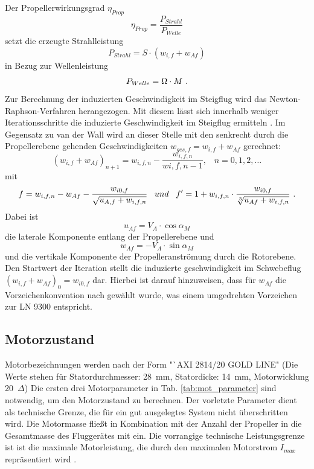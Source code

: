 Der Propellerwirkungsgrad \ensuremath{\eta_{Prop}} 
\begin{equation}
	\eta_{Prop} = \frac{P_{Strahl}}{P_{Welle}}
\end{equation}
setzt die erzeugte Strahlleistung 
\begin{equation}
	P_{Strahl} = S\cdot (w_{i,f}+ w_{Af})
	\label{eq:strahlleistung}
\end{equation}
in Bezug zur Wellenleistung
\begin{equation}
	P_{Welle} = \Omega \cdot M ~\text{.}
\end{equation} 
Zur Berechnung der induzierten Geschwindigkeit im Steigflug wird das Newton-Raphson-Verfahren herangezogen. Mit diesem lässt sich innerhalb weniger Iterationsschritte die induzierte Geschwindigkeit im Steigflug ermitteln \cite[S.153]{Wall.2015}. Im Gegensatz zu van der Wall wird an dieser Stelle mit den senkrecht durch die Propellerebene gehenden Geschwindigkeiten \ensuremath{w_{ges,f} = w_{i,f} + w_{Af}} gerechnet:
\begin{equation}
	(w_{i,f} + w_{Af})_{n+1} = w_{i,f,n} - \frac{w_{i,f,n}}{wi,f,n-1}, \;\;\; n = 0,1,2,\dots
\end{equation}
mit 
\begin{equation}
	f = w_{i,f,n} - w_{Af} - \frac{w_{i0,f}}{\sqrt{u_{A,f}+w_{i,f,n}}} \;\;\; und \;\;\; f'=1 + w_{i,f,n}\cdot\frac{w_{i0,f}}{\sqrt[3]{u_{Af}+w_{i,f,n}}} ~\text{.}
\end{equation}
Dabei ist 
\begin{equation}
	u_{Af} = V_{A}\cdot\cos\alpha_{M}
\end{equation}
die laterale Komponente entlang der Propellerebene und 
\begin{equation}
	w_{Af} = - V_{A}\cdot\sin\alpha_{M}
\end{equation}
und die vertikale Komponente der Propelleranströmung durch die Rotorebene. Den Startwert der Iteration stellt die induzierte geschwindigkeit im Schwebeflug \ensuremath{(w_{i,f}+w_{Af})_{0} = w_{i0,f}} dar. Hierbei ist darauf hinzuweisen, dass für \ensuremath{w_{Af}} die Vorzeichenkonvention nach \cite{Wall.2015} gewählt wurde, was einem umgedrehten Vorzeichen zur LN 9300 entspricht. 


\subsection{Motorzustand}
\label{subsec:motorzustand}
Motorbezeichnungen werden nach der Form "`AXI 2814/20 GOLD LINE"\; (Die Werte stehen für Statordurchmesser: \SI{28}{mm}, Statordicke: \SI{14}{mm}, Motorwicklung \SI{20}{\ensuremath{\Delta}}) 
Die ersten drei Motorparameter in Tab. \ref{tab:mot_parameter} sind notwendig, um den Motorzustand zu berechnen. Der vorletzte Parameter dient als technische Grenze, die für ein gut ausgelegtes System nicht überschritten wird. Die Motormasse fließt in Kombination mit der Anzahl der Propeller in die Gesamtmasse des Fluggerätes mit ein. Die vorrangige technische Leistungsgrenze ist ist die maximale Motorleistung, die durch den maximalen Motorstrom \ensuremath{I_{max}} repräsentiert wird \cite{axi}. 

